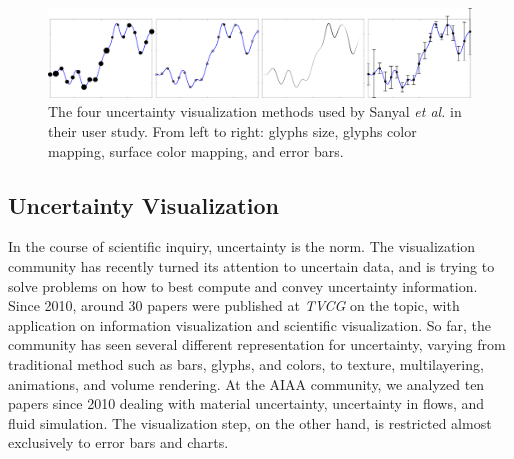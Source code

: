 
\begin{figure}[b]
\centering
\includegraphics[width=1\linewidth]{chapter6/figures/curve.png}
\caption{The four uncertainty visualization methods used by Sanyal \emph{et al.} \cite{Sanyal:2009:USC:1638611.1639227} in their user study. From left to right: glyphs size, glyphs color mapping, surface color mapping, and error bars.}
\label{fig:uncertainty_user_study}
\end{figure}


\subsection{Uncertainty Visualization}

In the course of scientific inquiry, uncertainty is the norm. The visualization community has recently turned its attention to uncertain data, and is trying to solve problems on how to best compute and convey uncertainty information. Since 2010, around 30 papers were published at {\em TVCG} on the topic, with application on information visualization and scientific visualization. So far, the community has seen several different representation for uncertainty, varying from traditional method such as bars, glyphs, and colors, to texture, multilayering, animations, and volume rendering. At the AIAA community, we analyzed ten papers since 2010 dealing with material uncertainty, uncertainty in flows, and fluid simulation. The visualization step, on the other hand, is restricted almost exclusively to error bars and charts.

